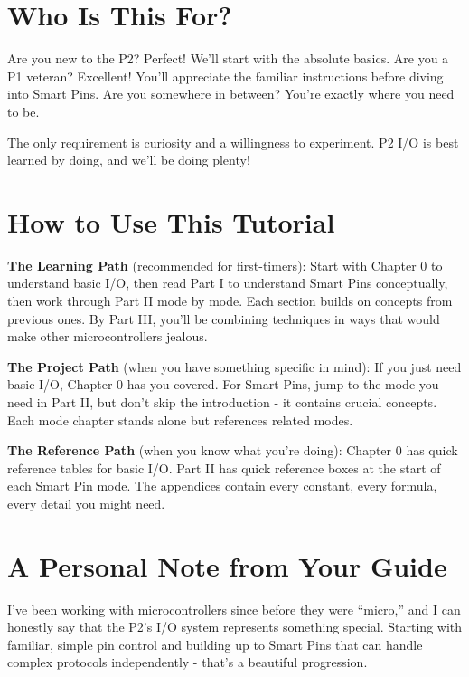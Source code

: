 \documentclass[11pt,a4paper,oneside,english]{book}
\begin{document}
\hypertarget{who-is-this-for}{%
\section{Who Is This For?}\label{who-is-this-for}}

Are you new to the P2? Perfect! We'll start with the absolute basics.
Are you a P1 veteran? Excellent! You'll appreciate the familiar
instructions before diving into Smart Pins. Are you somewhere in
between? You're exactly where you need to be.

The only requirement is curiosity and a willingness to experiment. P2
I/O is best learned by doing, and we'll be doing plenty!

\hypertarget{how-to-use-this-tutorial}{%
\section{How to Use This Tutorial}\label{how-to-use-this-tutorial}}

\textbf{The Learning Path} (recommended for first-timers): Start with
Chapter 0 to understand basic I/O, then read Part I to understand Smart
Pins conceptually, then work through Part II mode by mode. Each section
builds on concepts from previous ones. By Part III, you'll be combining
techniques in ways that would make other microcontrollers jealous.

\textbf{The Project Path} (when you have something specific in mind): If
you just need basic I/O, Chapter 0 has you covered. For Smart Pins, jump
to the mode you need in Part II, but don't skip the introduction - it
contains crucial concepts. Each mode chapter stands alone but references
related modes.

\textbf{The Reference Path} (when you know what you're doing): Chapter 0
has quick reference tables for basic I/O. Part II has quick reference
boxes at the start of each Smart Pin mode. The appendices contain every
constant, every formula, every detail you might need.

\hypertarget{a-personal-note-from-your-guide}{%
\section{A Personal Note from Your
Guide}\label{a-personal-note-from-your-guide}}

I've been working with microcontrollers since before they were
``micro,'' and I can honestly say that the P2's I/O system represents
something special. Starting with familiar, simple pin control and
building up to Smart Pins that can handle complex protocols
independently - that's a beautiful progression.
\end{document}
